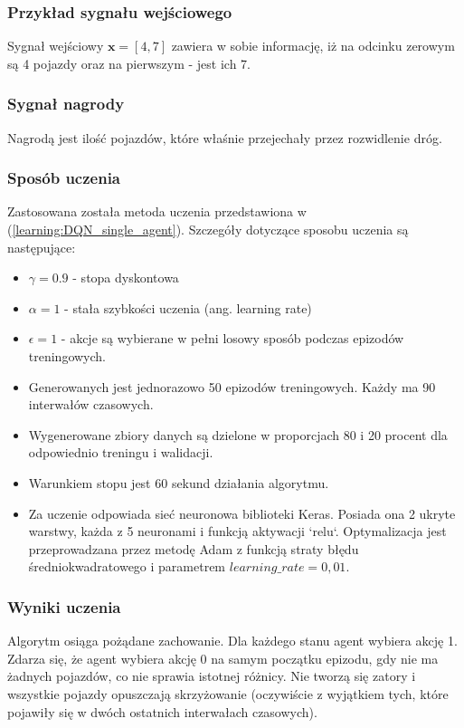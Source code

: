 \documentclass[12pt]{book}
\theoremstyle{plain}
\newcommand{\myref}[1]{(\ref{#1})}
\begin{document}
\subsubsection*{Przykład sygnału wejściowego}
Sygnał wejściowy $ \textbf{x}=[4,7] $ zawiera w sobie informację, iż na odcinku zerowym są 4 pojazdy oraz na pierwszym - jest ich 7. 
\subsubsection*{Sygnał nagrody}
Nagrodą jest ilość pojazdów, które właśnie przejechały przez rozwidlenie dróg.
\subsubsection*{Sposób uczenia}
Zastosowana została metoda uczenia przedstawiona w \myref{learning:DQN_single_agent}. Szczegóły dotyczące sposobu uczenia są następujące:
\begin{itemize}
	\item $\gamma = 0.9$ - stopa dyskontowa
	\item $\alpha = 1$ - stała szybkości uczenia (ang. learning rate)
	\item $\epsilon = 1$ - akcje są wybierane w pełni losowy sposób podczas epizodów treningowych.
	\item Generowanych jest jednorazowo 50 epizodów treningowych. Każdy ma 90 interwałów czasowych.
	\item Wygenerowane zbiory danych są dzielone w proporcjach 80 i 20 procent dla odpowiednio treningu i walidacji.
	\item Warunkiem stopu jest 60 sekund działania algorytmu.
	\item Za uczenie odpowiada sieć neuronowa biblioteki Keras. Posiada ona 2 ukryte warstwy, każda z 5 neuronami i funkcją aktywacji `relu`. Optymalizacja jest przeprowadzana przez metodę Adam z funkcją straty błędu średniokwadratowego i parametrem $learning\_rate = 0,01$. 
\end{itemize}

\subsubsection{Wyniki uczenia}
Algorytm osiąga pożądane zachowanie. Dla każdego stanu agent wybiera akcję 1. Zdarza się, że agent wybiera akcję 0 na samym początku epizodu, gdy nie ma żadnych pojazdów, co nie sprawia istotnej różnicy. Nie tworzą się zatory i wszystkie pojazdy opuszczają skrzyżowanie (oczywiście z wyjątkiem tych, które pojawiły się w dwóch ostatnich interwałach czasowych).
\end{document}
